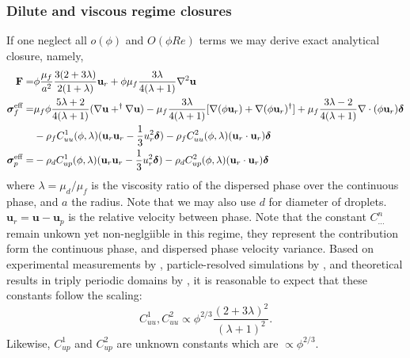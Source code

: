\documentclass[11pt]{My_preprint}
\begin{document}
\subsubsection{Dilute and viscous regime closures}
If one neglect all $o(\phi)$ and $O(\phi Re)$ terms we may derive exact analytical closure, namely,  
\begin{align}
    \textbf{F}=&
    \phi
    \frac{\mu_f}{a^2}
    \frac{3(2+3\lambda)}{2(1+\lambda)}\textbf{u}_r
    + \phi\mu_f  \frac{3\lambda}{4(\lambda +1)} \grad^2 \textbf{u}
    \\
    \bm\sigma_f^\text{eff}
    =&
     \mu_f \phi \frac{5\lambda +2}{4(\lambda+1)} (\grad \textbf{u}+^\dagger \grad \textbf{u})
    - \mu_f \frac{3\lambda}{4(\lambda+1)} [
    \grad(\phi \textbf{u}_r)
    + \grad(\phi \textbf{u}_r)^\dagger]
    + \mu_f \frac{3\lambda - 2}{4(\lambda+1)} \div(\phi \textbf{u}_r)  \bm\delta\nonumber\\
    &-\rho_f C^1_{uu}(\phi,\lambda)  (\textbf{u}_r \textbf{u}_r - \frac{1}{3}u_r^2\bm\delta)
    -\rho_f C^2_{uu} (\phi,\lambda) (\textbf{u}_r \cdot \textbf{u}_r)\bm\delta
    \label{eq:sigma_feffff}\\
    \bm\sigma_p^\text{eff}
    =&
    -\rho_d C^1_{up}(\phi,\lambda) (\textbf{u}_r \textbf{u}_r-\frac{1}{3}u_r^2\bm\delta)
    -\rho_d C^2_{up}(\phi,\lambda) (\textbf{u}_r \cdot \textbf{u}_r)\bm\delta
\end{align}
where $\lambda = \mu_d/\mu_f$ is the viscosity ratio of the dispersed phase over the continuous phase, and $a$ the radius.
Note that we may also use $d$ for diameter of droplets.  
$\textbf{u}_r = \textbf{u}- \textbf{u}_p$ is the relative velocity between phase. 
Note that the constant $C^n_{\ldots}$ remain unkown yet non-neglgiible in this regime, they represent the contribution form the continuous phase, and dispersed phase velocity variance. 
Based on experimental measurements by \citet{cartellier2009induced}, particle-resolved simulations by \citet{fintzi2025}, and theoretical results in triply periodic domains by \citet{hill2001first}, it is reasonable to expect that these constants follow the scaling:
\begin{equation}
C_{uu}^1, C_{uu}^2 \propto \phi^{2/3} \frac{(2+3\lambda)^2}{(\lambda+1)^2}.
\end{equation}
Likewise, $C_{up}^1$ and $C_{up}^2$ are unknown constants which are $\propto \phi^{2/3}$\citep{guazzelli2011fluctuations}. 
\end{document}
